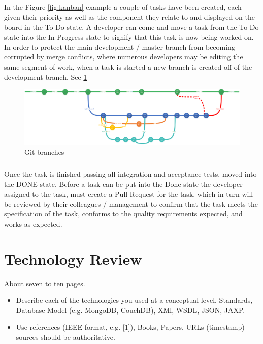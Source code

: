 \paragraph{}In the Figure \ref{fig:kanban} example a couple of tasks have been created, each given their priority as well as the component they relate to and displayed on the board in the To Do state. A developer can come and move a task from the To Do state into the In Progress state to signify that this task is now being worked on. In order to protect the main development / master branch from becoming corrupted by merge conflicts, where numerous developers may be editing the same segment of work, when a task is started a new branch is created off of the development branch\cite{driessen}. See \ref{fig:branches}

\begin{figure}
\includegraphics[width=\textwidth]{img/branch.png}
\caption{Git branches}
\label{fig:branches}
\end{figure}

\paragraph{}
Once the task is finished passing all integration and acceptance tests, moved into the DONE state. Before a task can be put into the Done state the developer assigned to the task, must create a Pull Request for the task, which in turn will be reviewed by their colleagues / management to confirm that the task meets the specification of the task, conforms to the quality requirements expected, and works as expected\cite{driessen}.

\chapter{Technology Review}
About seven to ten pages.
\begin{itemize}
\item Describe each of the technologies you used at a conceptual level. Standards, Database Model (e.g. MongoDB, CouchDB), XMl, WSDL, JSON, JAXP.
\item Use references (IEEE format, e.g. [1]), Books, Papers, URLs (timestamp) – sources should be authoritative. 
\end{itemize}

